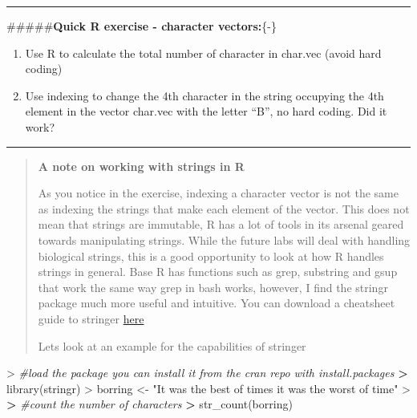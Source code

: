 \documentclass[
]{book}
\newenvironment{Shaded}{\begin{snugshade}}{\end{snugshade}}
\newcommand{\CommentTok}[1]{\textcolor[rgb]{0.56,0.35,0.01}{\textit{#1}}}
\newcommand{\ErrorTok}[1]{\textcolor[rgb]{0.64,0.00,0.00}{\textbf{#1}}}
\newcommand{\FunctionTok}[1]{\textcolor[rgb]{0.00,0.00,0.00}{#1}}
\newcommand{\NormalTok}[1]{#1}
\newcommand{\OtherTok}[1]{\textcolor[rgb]{0.56,0.35,0.01}{#1}}
\newcommand{\SpecialCharTok}[1]{\textcolor[rgb]{0.00,0.00,0.00}{#1}}
\newcommand{\StringTok}[1]{\textcolor[rgb]{0.31,0.60,0.02}{#1}}
\theoremstyle{definition}
\theoremstyle{definition}
\theoremstyle{definition}
\theoremstyle{definition}
\theoremstyle{remark}
\begin{document}
\begin{center}\rule{0.5\linewidth}{0.5pt}\end{center}

\#\#\#\#\#\textbf{Quick R exercise - character vectors:}\{-\}

\begin{enumerate}
\def\labelenumi{\arabic{enumi}.}
\item
  Use R to calculate the total number of character in char.vec (avoid hard coding)
\item
  Use indexing to change the 4th character in the string occupying the 4th element in the vector char.vec with the letter ``B'', no hard coding. Did it work?
\end{enumerate}

\begin{center}\rule{0.5\linewidth}{0.5pt}\end{center}

\begin{quote}
\textbf{A note on working with strings in R}

As you notice in the exercise, indexing a character vector is not the same as indexing the strings that make each
element of the vector. This does not mean that strings are immutable, R has a lot of tools in its arsenal geared
towards manipulating strings. While the future labs will deal with handling biological strings, this is a good
opportunity to look at how R handles strings in general.
Base R has functions such as grep, substring and gsup that work the same way grep in bash works, however, I find the
stringr package much more useful and intuitive.
You can download a cheatsheet guide to stringer \href{https://rstudio.com/resources/cheatsheets/}{here}

Lets look at an example for the capabilities of stringer
\end{quote}

\begin{Shaded}
\begin{Highlighting}[]
\SpecialCharTok{\textgreater{}} \CommentTok{\#load the package you can install it from the cran repo with install.packages}
\ErrorTok{\textgreater{}} \FunctionTok{library}\NormalTok{(stringr)}
\SpecialCharTok{\textgreater{}}\NormalTok{ borring }\OtherTok{\textless{}{-}} \StringTok{"It was the best of times it was the worst of time"}
\SpecialCharTok{\textgreater{}} 
\ErrorTok{\textgreater{}} \CommentTok{\#count the number of characters}
\ErrorTok{\textgreater{}} \FunctionTok{str\_count}\NormalTok{(borring)}
\end{Highlighting}
\end{Shaded}
\end{document}
